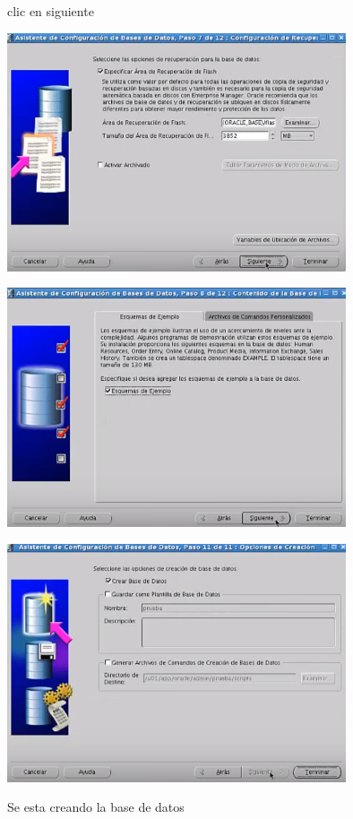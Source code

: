 \documentclass[12pt,letterpaper]{article}
\begin{document}
clic en siguiente \\
\begin{center}
\includegraphics[width=10cm]{oraclelinux/41.png}
\end{center}
\begin{center}
\includegraphics[width=10cm]{oraclelinux/42.png}
\end{center}
\begin{center}
\includegraphics[width=10cm]{oraclelinux/43.png}
\end{center}
Se esta creando la base de datos \\
\end{document}

